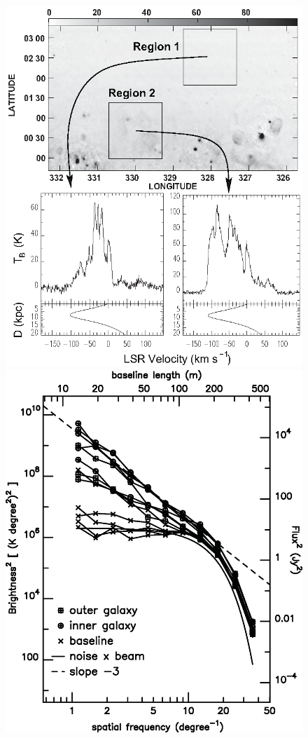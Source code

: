 \documentclass[12pt]{article}
\begin{document}
            \begin{figure}[hb]
              \centering
              \includegraphics[totalheight=80 mm]{img/Dickey2001_regions.eps}
              \includegraphics[totalheight=80 mm]{img/Dickey2001_region1.eps}
            \end{figure}   
\end{document}
